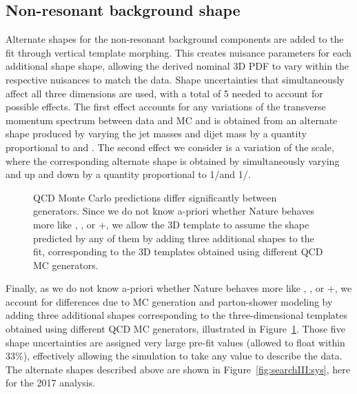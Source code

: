 \subsection{Non-resonant background shape}
Alternate shapes for the non-resonant background components are added to the fit through vertical template morphing. This creates nuisance parameters for each additional shape shape, allowing the derived nominal 3D PDF to vary within the respective nuisances to match the data. Shape uncertainties that simultaneously affect all three dimensions are used, with a total of 5 needed to account for possible effects. The first effect accounts for any variations of the transverse momentum spectrum between data and MC and is obtained from an alternate shape produced by varying the jet masses \MJ and dijet mass \MVV by a quantity proportional to \MJ and \MVV. The second effect we consider is a variation of the scale, where the corresponding alternate shape is obtained by simultaneously varying \MJ and \MVV up and down by a quantity proportional to 1/\MVV and 1/\MJ.
\begin{figure}[h!]
\centering
{}
\caption{QCD Monte Carlo predictions differ significantly between generators. Since we do not know a-priori whether Nature behaves more like , \HERWIG{++}, or \MADGRAPH{}+, we allow the 3D template to assume the shape predicted by any of them by adding three additional shapes to the fit, corresponding to the 3D templates obtained using different QCD MC generators.}
\label{nonResUnc}
\end{figure}
Finally, as we do not know a-priori whether Nature behaves more like , \HERWIG{++}, or \MADGRAPH{}+, we account for differences due to MC generation and parton-shower modeling by adding three additional shapes corresponding to the three-dimensional templates obtained using different QCD MC generators, illustrated in Figure~\ref{nonResUnc}. Those five shape uncertainties are assigned very large pre-fit values (allowed to float within 33\%), effectively allowing the simulation to take any value to describe the data. The alternate shapes described above are shown in Figure~\ref{fig:searchIII:sys}, here for the 2017 analysis.
